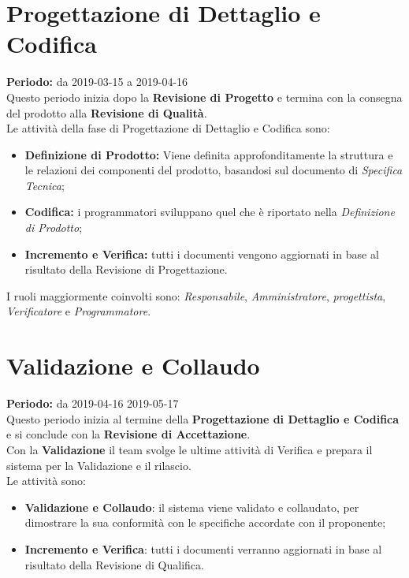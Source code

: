 \section{Progettazione di Dettaglio e Codifica}
\textbf{Periodo:} da 2019-03-15 a 2019-04-16\\
Questo periodo inizia dopo la \textbf{Revisione di Progetto} e termina con la consegna del prodotto alla \textbf{Revisione di Qualità}.\\Le attività della fase di Progettazione di Dettaglio e Codifica sono:
\begin{itemize}
    \item \textbf{Definizione di Prodotto:} Viene definita approfonditamente la struttura e le relazioni dei componenti del prodotto, basandosi sul documento di \textit{Specifica Tecnica};
    \item \textbf{Codifica:} i programmatori sviluppano quel che è riportato nella \textit{Definizione di Prodotto};
    \item \textbf{Incremento e Verifica:} tutti i documenti vengono aggiornati in base al risultato della Revisione di Progettazione.
\end{itemize}
I ruoli maggiormente coinvolti sono: \textit{Responsabile}, \textit{Amministratore}, \textit{progettista}, \textit{Verificatore} e \textit{Programmatore}.

\section{Validazione e Collaudo}
\textbf{Periodo:} da 2019-04-16 2019-05-17\\
Questo periodo inizia al termine della \textbf{Progettazione di Dettaglio e Codifica} e si conclude con la \textbf{Revisione di Accettazione}.\\Con la \textbf{Validazione} il team svolge le ultime attività di Verifica e prepara il sistema per la Validazione e il rilascio.\\
Le attività sono:
\begin{itemize}
    \item \textbf{Validazione e Collaudo}: il sistema viene validato e collaudato, per dimostrare la sua conformità con le specifiche accordate con il proponente;
    \item \textbf{Incremento e Verifica}: tutti i documenti verranno aggiornati in base al risultato della Revisione di Qualifica.
\end{itemize}
